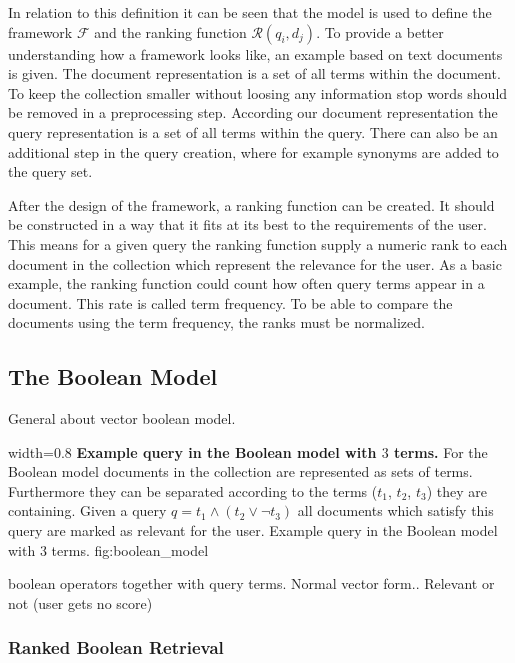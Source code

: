 In relation to this definition it can be seen that the model is used to define the framework $\mathcal{F}$ and the ranking function $\mathcal{R}(q_i, d_j)$. To provide a better understanding how a framework looks like, an example based on text documents is given. The document representation is a set of all terms within the document. To keep the collection smaller without loosing any information stop words should be removed in a preprocessing step. According our document representation the query representation is a set of all terms within the query. There can also be an additional step in the query creation, where for example synonyms are added to the query set.

After the design of the framework, a ranking function can be created. It should be constructed in a way that it fits at its best to the requirements of the user. This means for a given query the ranking function supply a numeric rank to each document in the collection which represent the relevance for the user. As a basic example, the ranking function could count how often query terms appear in a document. This rate is called term frequency. To be able to compare the documents using the term frequency, the ranks must be normalized.


\subsection{The Boolean Model}
\label{sec:the_boolean_model}

General about vector boolean model.

      {width=0.8\textwidth}
      {\textbf{Example query in the Boolean model with $3$ terms.} For the Boolean model documents in the collection are represented as sets of terms. Furthermore they can be separated according to the terms ($t_1$, $t_2$, $t_3$) they are containing. Given a query $q=t_1 \wedge (t_2 \vee \neg t_3)$ all documents which satisfy this query are marked as relevant for the user.}
      {Example query in the Boolean model with $3$ terms.}
      {fig:boolean_model}

boolean operators together with query terms. Normal vector form..
Relevant or not (user gets no score)

\subsubsection{Ranked Boolean Retrieval}
\label{sec:ranked_boolean_retrieval}

